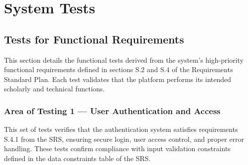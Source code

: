 \documentclass[12pt, titlepage]{article}
\begin{document}


\section{System Tests}

\subsection{Tests for Functional Requirements}

This section details the functional tests derived from the system’s high-priority functional requirements defined in sections S.2 and S.4 of the Requirements Standard Plan. Each test validates that the platform performs its intended scholarly and technical functions.

\subsubsection{Area of Testing 1 — User Authentication and Access}

This set of tests verifies that the authentication system satisfies requirements S.4.1 from the SRS, ensuring secure login, user access control, and proper error handling. These tests confirm compliance with input validation constraints defined in the data constraints table of the SRS.
\end{document}
